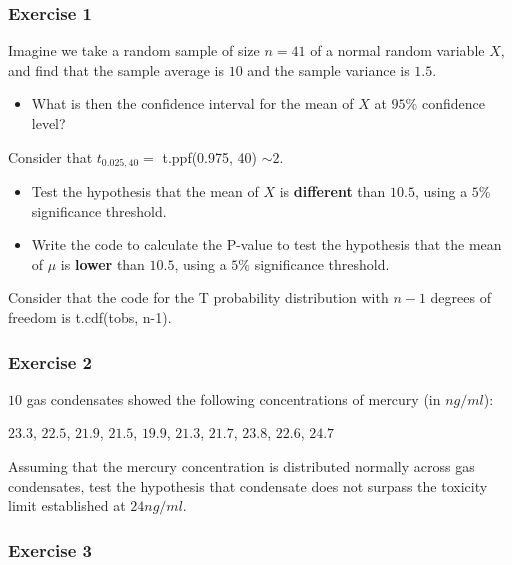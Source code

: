 \documentclass[
]{book}
\providecommand{\tightlist}{%
  \setlength{\itemsep}{0pt}\setlength{\parskip}{0pt}}
\begin{document}
\hypertarget{exercise-1-11}{%
\subsubsection{Exercise 1}\label{exercise-1-11}}

Imagine we take a random sample of size \(n = 41\) of a normal random variable \(X\), and find that the sample average is \(10\) and the sample variance is \(1.5\).

\begin{itemize}
\tightlist
\item
  What is then the confidence interval for the mean of \(X\) at \(95\%\) confidence level?
\end{itemize}

Consider that \(t_{0.025,40}=\) t.ppf(0.975, 40) \(\sim 2\).

\begin{itemize}
\item
  Test the hypothesis that the mean of \(X\) is \textbf{different} than \(10.5\), using a \(5\%\) significance threshold.
\item
  Write the code to calculate the P-value to test the hypothesis that the mean of \(\mu\) is \textbf{lower} than \(10.5\), using a \(5\%\) significance threshold.
\end{itemize}

Consider that the code for the T probability distribution with \(n-1\) degrees of freedom is t.cdf(tobs, n-1).

\hypertarget{exercise-2-11}{%
\subsubsection{Exercise 2}\label{exercise-2-11}}

\(10\) gas condensates showed the following concentrations of mercury (in \(ng/ml\)):

\(23.3\), \(22.5\), \(21.9\), \(21.5\), \(19.9\), \(21.3\), \(21.7\), \(23.8\), \(22.6\), \(24.7\)

Assuming that the mercury concentration is distributed normally across gas condensates, test the hypothesis that condensate does not surpass the toxicity limit established at \(24 ng/ml\).

\hypertarget{exercise-3-9}{%
\subsubsection{Exercise 3}\label{exercise-3-9}}
\end{document}
